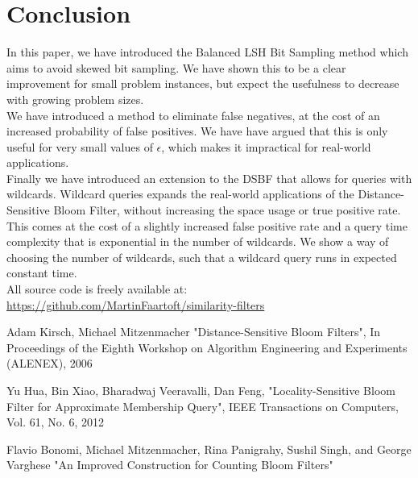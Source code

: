 \documentclass[a4paper,11pt]{article}
\begin{document}
\section{Conclusion}

In this paper, we have introduced the Balanced LSH Bit Sampling method which aims to avoid skewed bit sampling. We have shown this to be a clear improvement for small problem instances, but expect the usefulness to decrease with growing problem sizes.\\

We have introduced a method to eliminate false negatives, at the cost of an increased probability of false positives. We have have argued that this is only useful for very small values of $\epsilon$, which makes it impractical for real-world applications.\\

Finally we have introduced an extension to the DSBF that allows for queries with wildcards. Wildcard queries expands the real-world applications of the Distance-Sensitive Bloom Filter, without increasing the space usage or true positive rate. This comes at the cost of a slightly increased false positive rate and a query time complexity that is exponential in the number of wildcards. We show a way of choosing the number of wildcards, such that a wildcard query runs in expected constant time.\\

All source code is freely available at: \\\url{https://github.com/MartinFaartoft/similarity-filters}

\newpage

\begin{thebibliography}{}

Adam Kirsch, Michael Mitzenmacher
"Distance-Sensitive Bloom Filters", In Proceedings of the Eighth Workshop on Algorithm Engineering and Experiments (ALENEX), 2006

Yu Hua, Bin Xiao, Bharadwaj Veeravalli, Dan Feng, "Locality-Sensitive Bloom Filter for Approximate Membership Query", IEEE Transactions on Computers, Vol. 61, No. 6, 2012


Flavio Bonomi, Michael Mitzenmacher, Rina Panigrahy, Sushil Singh, and George Varghese
"An Improved Construction for Counting Bloom Filters"

\end{thebibliography}
\end{document}
